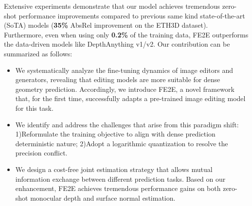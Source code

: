 \documentclass{article} %
\begin{document}
Extensive experiments demonstrate that our model achieves tremendous zero-shot performance improvements compared to previous same kind state-of-the-art (SoTA) models (\textbf{35\%} AbsRel improvement on the ETH3D dataset). Furthermore, even when using only \textbf{0.2\%} of the training data, FE2E outperforms the data-driven models like DepthAnything v1/v2. Our contribution can be summarized as follows:
\begin{itemize}[leftmargin=*,nosep]
  \item We systematically analyze the fine-tuning dynamics of image editors and generators, revealing that editing models are more suitable for dense geometry prediction. Accordingly, we introduce FE2E, a novel framework that, for the first time, successfully adapts a pre-trained image editing model for this task.
  \item We identify and address the challenges that arise from this paradigm shift: 1)Reformulate the training objective to align with dense prediction deterministic nature; 2)Adopt a logarithmic quantization to resolve the precision conflict.
 \item We design a cost-free joint estimation strategy that allows mutual information exchange between different prediction tasks. Based on our enhancement, FE2E achieves tremendous performance gains on both zero-shot monocular depth and surface normal estimation.
\end{itemize}

\vspace{-1em}
\end{document}
